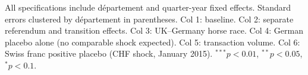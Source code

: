 \begin{table}[htbp]
   \par \raggedright
   \footnotesize All specifications include d\'{e}partement and quarter-year fixed effects. Standard errors clustered by d\'{e}partement in parentheses. Col 1: baseline. Col 2: separate referendum and transition effects. Col 3: UK--Germany horse race. Col 4: German placebo alone (no comparable shock expected). Col 5: transaction volume. Col 6: Swiss franc positive placebo (CHF shock, January 2015). $^{***}p<0.01$, $^{**}p<0.05$, $^{*}p<0.1$.
\end{table}
